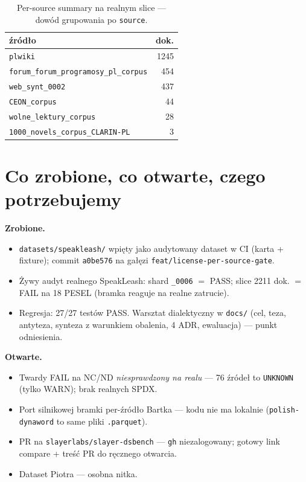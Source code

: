 \begin{table}[h]
  \centering
  \caption{Per-source summary na realnym slice --- dowód grupowania po \texttt{source}.}
  \label{tab:persource}
  \begin{tabular}{lr}
    \toprule
    źródło & dok. \\
    \midrule
    \texttt{plwiki}                        & 1245 \\
    \texttt{forum\_forum\_programosy\_pl\_corpus} & 454 \\
    \texttt{web\_synt\_0002}               & 437 \\
    \texttt{CEON\_corpus}                  & 44 \\
    \texttt{wolne\_lektury\_corpus}        & 28 \\
    \texttt{1000\_novels\_corpus\_CLARIN-PL} & 3 \\
    \bottomrule
  \end{tabular}
\end{table}

\section{Co zrobione, co otwarte, czego potrzebujemy}
\textbf{Zrobione.}
\begin{itemize}
  \item \texttt{datasets/speakleash/} wpięty jako audytowany dataset w CI (karta +
        fixture); commit \texttt{a0be576} na gałęzi \texttt{feat/license-per-source-gate}.
  \item Żywy audyt realnego SpeakLeash: shard \texttt{\_0006} $=$ PASS; slice 2211 dok.
        $=$ FAIL na 18 PESEL (bramka reaguje na realne zatrucie).
  \item Regresja: 27/27 testów PASS. Warsztat dialektyczny w \texttt{docs/} (cel, teza,
        antyteza, synteza z warunkiem obalenia, 4 ADR, ewaluacja) --- punkt odniesienia.
\end{itemize}

\textbf{Otwarte.}
\begin{itemize}
  \item Twardy FAIL na NC/ND \emph{niesprawdzony na realu} --- 76 źródeł to
        \texttt{UNKNOWN} (tylko WARN); brak realnych SPDX.
  \item Port silnikowej bramki per-źródło Bartka --- kodu nie ma lokalnie
        (\texttt{polish-dynaword} to same pliki \texttt{.parquet}).
  \item PR na \texttt{slayerlabs/slayer-dsbench} --- \texttt{gh} niezalogowany; gotowy
        link compare + treść PR do ręcznego otwarcia.
  \item Dataset Piotra --- osobna nitka.
\end{itemize}

